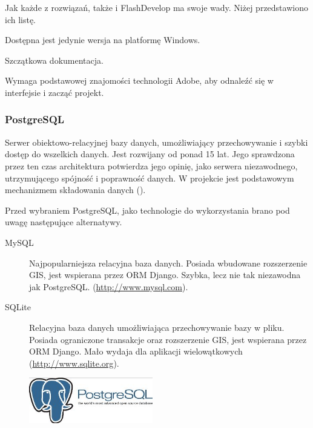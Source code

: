 Jak każde z rozwiązań, także i FlashDevelop ma swoje wady. Niżej przedstawiono ich listę.
\begin{packed_item}
    \item{Dostępna jest jedynie wersja na platformę Windows.}
    \item{Szczątkowa dokumentacja.}
    \item{Wymaga podstawowej znajomości technologii Adobe, aby odnaleźć się w interfejsie i zacząć projekt.}
\end{packed_item}


\newpage
\subsubsection{PostgreSQL}
Serwer obiektowo-relacyjnej bazy danych, umożliwiający przechowywanie i szybki dostęp do wszelkich danych. Jest rozwijany od ponad 15 lat. Jego sprawdzona przez ten czas architektura potwierdza jego opinię, jako serwera niezawodnego, utrzymującego spójność i poprawność danych. W projekcie jest podstawowym mechanizmem składowania danych (\cite{PostgreSQL}).

Przed wybraniem PostgreSQL, jako technologie do wykorzystania brano pod uwagę następujące alternatywy.
\begin{description}
    \item[MySQL] Najpopularniejsza relacyjna baza danych. Posiada wbudowane rozszerzenie GIS, jest wspierana przez ORM Django. Szybka, lecz nie tak niezawodna jak PostgreSQL.  (\url{http://www.mysql.com}).
    \item[SQLite] Relacyjna baza danych umożliwiająca przechowywanie bazy w pliku. Posiada ograniczone transakcje oraz rozszerzenie GIS, jest wspierana przez ORM Django. Mało wydaja dla aplikacji wielowątkowych (\url{http://www.sqlite.org}).
\end{description}

\begin{figure}
  \begin{center}
    \includegraphics[width=0.48\textwidth]{img/logos/postgresql.jpg}
  \end{center}
\end{figure}

